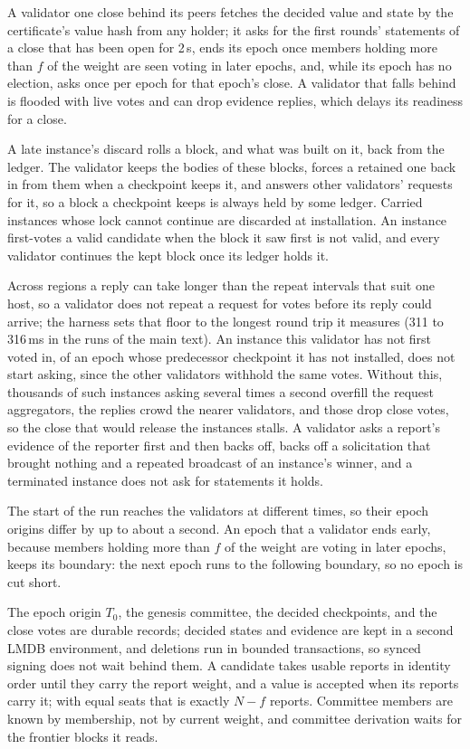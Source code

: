 \documentclass[conference]{IEEEtran}
\begin{document}
 A validator one close behind its peers fetches the decided value and state by the certificate's value hash from any holder; it asks for the first rounds' statements of a close that has been open for 2\,s, ends its epoch once members holding more than $f$ of the weight are seen voting in later epochs, and, while its epoch has no election, asks once per epoch for that epoch's close. A validator that falls behind is flooded with live votes and can drop evidence replies, which delays its readiness for a close.

 A late instance's discard rolls a block, and what was built on it, back from the ledger. The validator keeps the bodies of these blocks, forces a retained one back in from them when a checkpoint keeps it, and answers other validators' requests for it, so a block a checkpoint keeps is always held by some ledger. Carried instances whose lock cannot continue are discarded at installation. An instance first-votes a valid candidate when the block it saw first is not valid, and every validator continues the kept block once its ledger holds it.

 Across regions a reply can take longer than the repeat intervals that suit one host, so a validator does not repeat a request for votes before its reply could arrive; the harness sets that floor to the longest round trip it measures (311 to 316\,ms in the runs of the main text). An instance this validator has not first voted in, of an epoch whose predecessor checkpoint it has not installed, does not start asking, since the other validators withhold the same votes. Without this, thousands of such instances asking several times a second overfill the request aggregators, the replies crowd the nearer validators, and those drop close votes, so the close that would release the instances stalls. A validator asks a report's evidence of the reporter first and then backs off, backs off a solicitation that brought nothing and a repeated broadcast of an instance's winner, and a terminated instance does not ask for statements it holds.

 The start of the run reaches the validators at different times, so their epoch origins differ by up to about a second. An epoch that a validator ends early, because members holding more than $f$ of the weight are voting in later epochs, keeps its boundary: the next epoch runs to the following boundary, so no epoch is cut short.

 The epoch origin $T_0$, the genesis committee, the decided checkpoints, and the close votes are durable records; decided states and evidence are kept in a second LMDB environment, and deletions run in bounded transactions, so synced signing does not wait behind them. A candidate takes usable reports in identity order until they carry the report weight, and a value is accepted when its reports carry it; with equal seats that is exactly $N-f$ reports. Committee members are known by membership, not by current weight, and committee derivation waits for the frontier blocks it reads.
\end{document}

